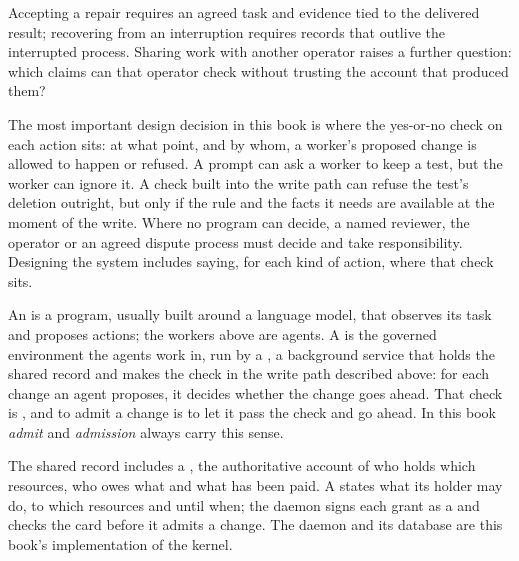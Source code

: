 \documentclass[11pt,a4paper,twoside]{article}
\begin{document}
Accepting a repair requires an agreed task and evidence tied to the
delivered result; recovering from an interruption requires records that outlive the interrupted process. Sharing work with another operator raises a further question: which
claims can that operator check without trusting the account that produced
them?

The most important design decision in this book is where the yes-or-no check
on each action sits: at what point, and by whom, a worker's proposed change is
allowed to happen or refused. A prompt can ask a
worker to keep a test, but the worker can ignore it. A check built into the
write path can refuse the test's deletion outright, but only if the rule and
the facts it needs are available at the moment of the write. Where no program
can decide, a named reviewer, the operator or an agreed dispute process must
decide and take responsibility. Designing the system includes saying, for each
kind of action, where that check sits.

An  is a program,
usually built around a language model, that observes its task and proposes
actions; the workers above are agents. A  is the governed environment the agents work in,
run by a , a background service that holds the shared record and
makes the check in the write path described above: for each change an agent
proposes, it decides whether the change goes ahead. That check is
, and to admit a change is to let it pass the check and go
ahead. In this book \emph{admit} and \emph{admission} always carry this sense.

The shared record includes a
, the authoritative account of who holds which resources, who
owes what and what has been paid. A  states what its holder may
do, to which resources and until when; the daemon signs each grant as a
 and checks the card before it admits a change. The
daemon and its database are this book's implementation of the kernel.
\end{document}
